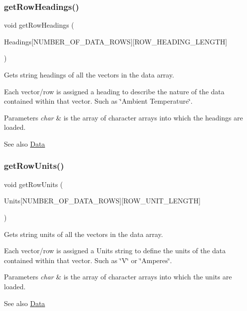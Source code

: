 \subsubsection{\texorpdfstring{getRowHeadings()}{getRowHeadings()}}
{\footnotesize\ttfamily void get\+Row\+Headings (\begin{DoxyParamCaption}\item[{char}]{Headings\mbox{[}\+N\+U\+M\+B\+E\+R\+\_\+\+O\+F\+\_\+\+D\+A\+T\+A\+\_\+\+R\+O\+W\+S\mbox{]}\mbox{[}\+R\+O\+W\+\_\+\+H\+E\+A\+D\+I\+N\+G\+\_\+\+L\+E\+N\+G\+T\+H\mbox{]} }\end{DoxyParamCaption})}



Gets string headings of all the vectors in the data array. 

Each vector/row is assigned a heading to describe the nature of the data contained within that vector. Such as \char`\"{}\+Ambient Temperature\char`\"{}. 
\begin{DoxyParams}{Parameters}
{\em char} & is the array of character arrays into which the headings are loaded. \\
\hline
\end{DoxyParams}
\begin{DoxySeeAlso}{See also}
\mbox{\hyperlink{struct_data}{Data}} 
\end{DoxySeeAlso}
\mbox{\label{class_data_source_abf7e2f4954b1c314fba8f0ac3194306e}} 
\subsubsection{\texorpdfstring{getRowUnits()}{getRowUnits()}}
{\footnotesize\ttfamily void get\+Row\+Units (\begin{DoxyParamCaption}\item[{char}]{Units\mbox{[}\+N\+U\+M\+B\+E\+R\+\_\+\+O\+F\+\_\+\+D\+A\+T\+A\+\_\+\+R\+O\+W\+S\mbox{]}\mbox{[}\+R\+O\+W\+\_\+\+U\+N\+I\+T\+\_\+\+L\+E\+N\+G\+T\+H\mbox{]} }\end{DoxyParamCaption})}



Gets string units of all the vectors in the data array. 

Each vector/row is assigned a Units string to define the units of the data contained within that vector. Such as \char`\"{}\+V\char`\"{} or \char`\"{}\+Amperes\char`\"{}. 
\begin{DoxyParams}{Parameters}
{\em char} & is the array of character arrays into which the units are loaded. \\
\hline
\end{DoxyParams}
\begin{DoxySeeAlso}{See also}
\mbox{\hyperlink{struct_data}{Data}} 
\end{DoxySeeAlso}
\mbox{\label{class_data_source_ac70e056b629dd62379c42af3e6ca6b1b}} 
